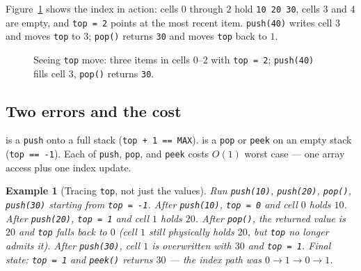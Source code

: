 \documentclass[11pt]{article}
\newtheorem{example}{Example}[section]
\begin{document}
Figure~\ref{fig:topmove} shows the index in action: cells $0$ through $2$ hold \texttt{10 20 30}, cells $3$ and $4$ are empty, and \texttt{top = 2} points at the most recent item. \texttt{push(40)} writes cell $3$ and moves \texttt{top} to $3$; \texttt{pop()} returns \texttt{30} and moves \texttt{top} back to $1$.

\begin{figure}[h]
  \centering
  \caption{Seeing \texttt{top} move: three items in cells $0$--$2$ with \texttt{top = 2}; \texttt{push(40)} fills cell $3$, \texttt{pop()} returns \texttt{30}.}
  \label{fig:topmove}
\end{figure}

\subsection{Two errors and the cost}

 is a \texttt{push} onto a full stack (\texttt{top + 1 == MAX}).  is a \texttt{pop} or \texttt{peek} on an empty stack (\texttt{top == -1}). Each of \texttt{push}, \texttt{pop}, and \texttt{peek} costs $O(1)$ worst case --- one array access plus one index update. 

\begin{example}[Tracing \texttt{top}, not just the values]
Run \texttt{push(10)}, \texttt{push(20)}, \texttt{pop()}, \texttt{push(30)} starting from \texttt{top = -1}. After \texttt{push(10)}, \texttt{top = 0} and cell $0$ holds $10$. After \texttt{push(20)}, \texttt{top = 1} and cell $1$ holds $20$. After \texttt{pop()}, the returned value is $20$ and \texttt{top} falls back to $0$ (cell $1$ still physically holds $20$, but \texttt{top} no longer admits it). After \texttt{push(30)}, cell $1$ is overwritten with $30$ and \texttt{top = 1}. Final state: \texttt{top = 1} and \texttt{peek()} returns $30$ --- the index path was $0 \to 1 \to 0 \to 1$. 
\end{example}
\end{document}
